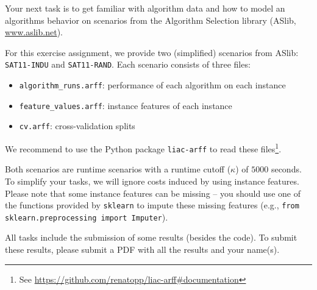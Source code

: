 \documentclass{exam}
\begin{document}
	\gccs
	Your next task is to get familiar with algorithm data and how to model an algorithms behavior
	on scenarios from the Algorithm Selection library (ASlib, \url{www.aslib.net}).  
	
	\bigskip
	
	For this exercise assignment, 
	we provide two (simplified) scenarios from ASlib: \texttt{SAT11-INDU} and \texttt{SAT11-RAND}.
	Each scenario consists of three files:
	\begin{itemize}
		\item \texttt{algorithm\_runs.arff}: performance of each algorithm on each instance
		\item \texttt{feature\_values.arff}: instance features of each instance 
		\item \texttt{cv.arff}: cross-validation splits
	\end{itemize}
	
	We recommend to use the Python package \texttt{liac-arff} to read these files\footnote{See \url{https://github.com/renatopp/liac-arff\#documentation}}.
	
	Both scenarios are runtime scenarios with a runtime cutoff ($\kappa$) of $5000$ seconds.
	To simplify your tasks, we will ignore costs induced by using instance features.
	Please note that some instance features can be missing -- you should use one of the functions provided by \texttt{sklearn} to impute these missing features (e.g., \texttt{from sklearn.preprocessing import Imputer}).
	
	\bigskip
	
	All tasks include the submission of some results (besides the code).
	To submit these results, please submit a PDF with all the results and your name(s).
	
\end{document}
